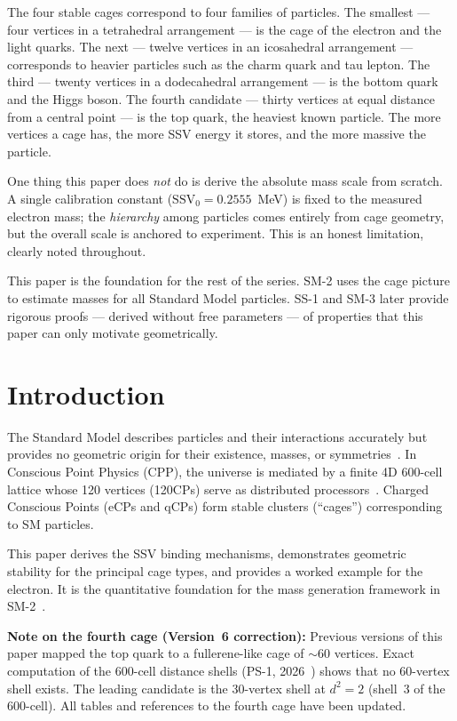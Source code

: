 \documentclass[11pt]{article}
\begin{document}
The four stable cages correspond to four families of particles.  The
smallest --- four vertices in a tetrahedral arrangement --- is the cage
of the electron and the light quarks.  The next --- twelve vertices in
an icosahedral arrangement --- corresponds to heavier particles such as
the charm quark and tau lepton.  The third --- twenty vertices in a
dodecahedral arrangement --- is the bottom quark and the Higgs boson.
The fourth candidate --- thirty vertices at equal distance from a
central point --- is the top quark, the heaviest known particle.  The
more vertices a cage has, the more SSV energy it stores, and the more
massive the particle.

One thing this paper does \textit{not} do is derive the absolute mass
scale from scratch.  A single calibration constant
($\text{SSV}_0 = 0.2555$~MeV) is fixed to the measured electron mass;
the \textit{hierarchy} among particles comes entirely from cage geometry,
but the overall scale is anchored to experiment.  This is an honest
limitation, clearly noted throughout.

This paper is the foundation for the rest of the series.  SM-2 uses the
cage picture to estimate masses for all Standard Model particles.  SS-1
and SM-3 later provide rigorous proofs --- derived without free
parameters --- of properties that this paper can only motivate
geometrically.

\section{Introduction}

The Standard Model describes particles and their interactions accurately
but provides no geometric origin for their existence, masses, or
symmetries~\cite{pdg2024}.  In Conscious Point Physics (CPP), the universe
is mediated by a finite 4D 600-cell lattice whose 120 vertices (120CPs)
serve as distributed processors~\cite{conway2008}.  Charged Conscious Points
(eCPs and qCPs) form stable clusters (``cages'') corresponding to SM particles.

This paper derives the SSV binding mechanisms, demonstrates geometric
stability for the principal cage types, and provides a worked example for
the electron.  It is the quantitative foundation for the mass generation
framework in SM-2~\cite{abshier_sm2}.

\textbf{Note on the fourth cage (Version~6 correction):}
Previous versions of this paper mapped the top quark to a fullerene-like
cage of ${\sim}60$ vertices.  Exact computation of the 600-cell distance
shells (PS-1, 2026~\cite{ps1}) shows that no 60-vertex shell exists.  The
leading candidate is the 30-vertex shell at $d^2 = 2$ (shell~3 of the
600-cell).  All tables and references to the fourth cage have been updated.
\end{document}
